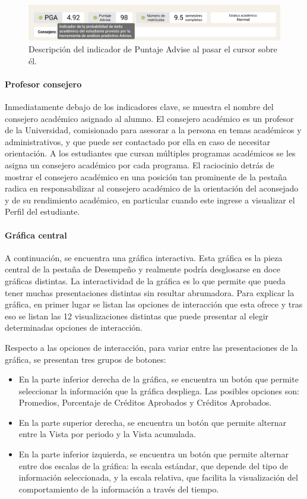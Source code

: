 \begin{figure}[H]
	\includegraphics[width=\textwidth]{assets/nes/indicadores.png}
	\caption{Descripción del indicador de Puntaje Advise al pasar el cursor sobre él.}
	\label{fig:indicadores}
\end{figure}

\paragraph{Profesor consejero} Inmediatamente debajo de los indicadores clave, se muestra el nombre del consejero académico asignado al alumno. El consejero académico es un profesor de la Universidad, comisionado para asesorar a la persona en temas académicos y administrativos, y que puede ser contactado por ella en caso de necesitar orientación. A los estudiantes que cursan múltiples programas académicos se les asigna un consejero académico por cada programa. El raciocinio detrás de mostrar el consejero académico en una posición tan prominente de la pestaña radica en responsabilizar al consejero académico de la orientación del aconsejado y de su rendimiento académico, en particular cuando este ingrese a visualizar el Perfil del estudiante.

\paragraph{Gráfica central} A continuación, se encuentra una gráfica interactiva. Esta gráfica es la pieza central de la pestaña de Desempeño y realmente podría desglosarse en doce gráficas distintas. La interactividad de la gráfica es lo que permite que pueda tener muchas presentaciones distintas sin resultar abrumadora. Para explicar la gráfica, en primer lugar se listan las opciones de interacción que esta ofrece y tras eso se listan las 12 visualizaciones distintas que puede presentar al elegir determinadas opciones de interacción.

Respecto a las opciones de interacción, para variar entre las presentaciones de la gráfica, se presentan tres grupos de botones:
\begin{itemize}
	\item En la parte inferior derecha de la gráfica, se encuentra un botón que permite seleccionar la información que la gráfica despliega. Las posibles opciones son: Promedios, Porcentaje de Créditos Aprobados y Créditos Aprobados.
	\item En la parte superior derecha, se encuentra un botón que permite alternar entre la Vista por periodo y la Vista acumulada.
	\item En la parte inferior izquierda, se encuentra un botón que permite alternar entre dos escalas de la gráfica: la escala estándar, que depende del tipo de información seleccionada, y la escala relativa, que facilita la visualización del comportamiento de la información a través del tiempo.
\end{itemize}

